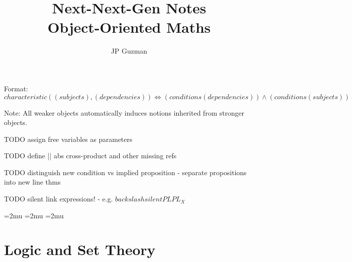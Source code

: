 \documentclass[a4paper]{article}
\title{Next-Next-Gen Notes \\
\large Object-Oriented Maths}
\author{JP Guzman}
\begin{document}
\maketitle
\allowdisplaybreaks

Format: $characteristic((subjects), (dependencies)) \iff (conditions(dependencies)) \land (conditions(subjects))$

Note: All weaker objects automatically induces notions inherited from stronger objects.

TODO assign free variables as parameters

TODO define || abs  cross-product and other missing refs

TODO distinguish new condition vs implied proposition
- separate propositions into new line thms

TODO silent link expressions!
- e.g. $backslash silentPL{PL_X}$

\thinmuskip=2mu %
\medmuskip=2mu %
\thickmuskip=2mu %
\setlength{\belowdisplayskip}{0pt} \setlength{\belowdisplayshortskip}{0pt}
\setlength{\abovedisplayskip}{0pt} \setlength{\abovedisplayshortskip}{0pt}


\section{Logic and Set Theory}
\end{document}
